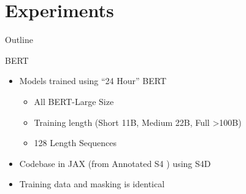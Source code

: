 \documentclass[14pt,aspectratio=169]{beamer}
\begin{document}



\section{Experiments}

\begin{frame}{Outline}
    \tableofcontents[currentsection]
\end{frame}


\begin{frame}{ BERT}
\begin{itemize}
    \item Models trained using ``24 Hour'' BERT \cite{izsak2021train}
    \begin{itemize}
        \item All BERT-Large Size
        \item Training length (Short 11B, Medium 22B, Full >100B)
        \item 128 Length Sequences
    \end{itemize}
    
    \item Codebase in JAX (from Annotated S4 {\small \cite{rush2022s4}}) using S4D
    \item Training data and masking is identical
\end{itemize}
\end{frame}

\end{document}
